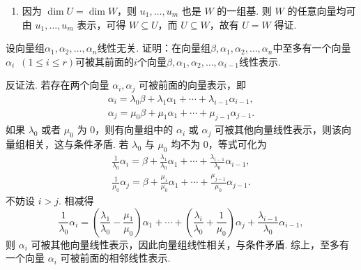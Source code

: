 \begin{exercise}
\begin{exgroup}
\begin{answer}
\begin{enumerate}
                \item 因为 $\dim U=\dim W$，则 $u_1,\ldots,u_m$ 也是 $W$ 的一组基. 则 $W$ 的任意向量均可由 $u_1,\ldots,u_m$ 表示，可得 $W\subseteq U$，而 $U\subseteq W$，故有 $U=W$ 得证.
            \end{enumerate}
        \end{answer}

        \item 设向量组$\alpha_1,\alpha_2,\ldots,\alpha_n$线性无关. 证明：在向量组$\beta,\alpha_1,\alpha_2,\ldots,\alpha_n$中至多有一个向量$\alpha_i\enspace(1 \leqslant i \leqslant r)$可被其前面的$i$个向量$\beta,\alpha_1,\alpha_2,\ldots,\alpha_{i-1}$线性表示.
        \begin{answer}
            反证法. 若存在两个向量 $\alpha_i,\alpha_j$ 可被前面的向量表示，即
            \begin{gather*}
                \alpha_i=\lambda_0\beta+\lambda_1\alpha_1+\cdots+\lambda_{i-1}\alpha_{i-1}, \\
                \alpha_j=\mu_0\beta+\mu_1\alpha_1+\cdots+\mu_{j-1}\alpha_{j-1}.
            \end{gather*}
            如果 $\lambda_0$ 或者 $\mu_0$ 为 0，则有向量组中的 $\alpha_i$ 或 $\alpha_j$ 可被其他向量线性表示，则该向量组相关，这与条件矛盾. 若 $\lambda_0$ 与 $\mu_0$ 均不为 0，等式可化为
            \begin{gather*}
                \frac 1{\lambda_0}\alpha_i=\beta+\frac{\lambda_1}{\lambda_0}\alpha_1+\cdots+\frac{\lambda_{i-1}}{\lambda_0}\alpha_{i-1}, \\
                \frac 1{\mu_0}\alpha_j=\beta+\frac{\mu_1}{\mu_0}\alpha_1+\cdots+\frac{\mu_{j-1}}{\mu_0}\alpha_{j-1}.
            \end{gather*}
            不妨设 $i>j$. 相减得
            \[\frac 1{\lambda_0}\alpha_i=\left(\frac{\lambda_1}{\lambda_0}-\frac{\mu_1}{\mu_0}\right)\alpha_1+\cdots+\left(\frac{\lambda_i}{\lambda_0}+\frac 1{\mu_0}\right)\alpha_j+\frac{\lambda_{i-1}}{\lambda_0}\alpha_{i-1},\]
            则 $\alpha_i$ 可被其他向量线性表示，因此向量组线性相关，与条件矛盾. 综上，至多有一个向量 $\alpha_i$ 可被前面的相邻线性表示.
        \end{answer}


\end{exgroup}
\end{exercise}
